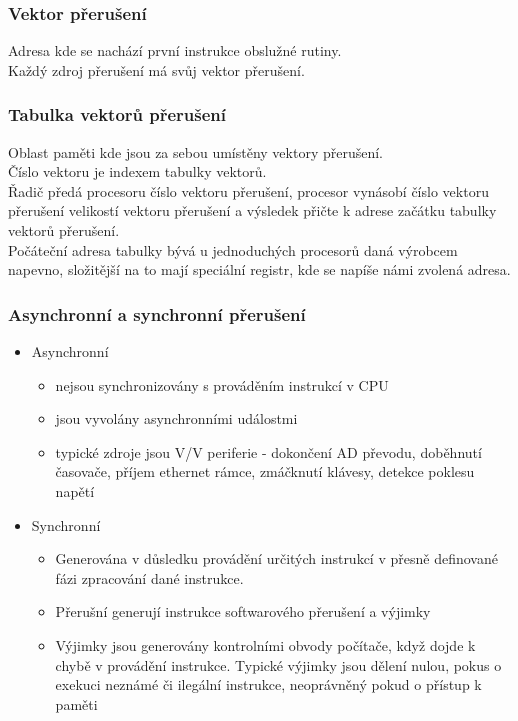 \subsubsection*{Vektor přerušení}
Adresa kde se nachází první instrukce obslužné rutiny.\\
Každý zdroj přerušení má svůj vektor přerušení.\\

\subsubsection*{Tabulka vektorů přerušení}
Oblast paměti kde jsou za sebou umístěny vektory přerušení.\\
Číslo vektoru je indexem tabulky vektorů.\\
Řadič předá procesoru číslo vektoru přerušení, procesor vynásobí číslo vektoru přerušení velikostí vektoru přerušení a výsledek přičte k adrese začátku tabulky vektorů přerušení.\\
Počáteční adresa tabulky bývá u jednoduchých procesorů daná výrobcem napevno, složitější na to mají speciální registr, kde se napíše námi zvolená adresa.

\subsubsection*{Asynchronní a synchronní přerušení}
\begin{itemize}
    \item Asynchronní
          \begin{itemize}
              \item nejsou synchronizovány s prováděním instrukcí v CPU
              \item jsou vyvolány asynchronními událostmi
              \item typické zdroje jsou V/V periferie - dokončení AD převodu, doběhnutí časovače, příjem ethernet rámce, zmáčknutí klávesy, detekce poklesu napětí
          \end{itemize}
    \item Synchronní
          \begin{itemize}
              \item Generována v důsledku provádění určitých instrukcí v přesně definované fázi zpracování dané instrukce.
              \item Přerušní generují instrukce softwarového přerušení a výjimky
              \item Výjimky jsou generovány kontrolními obvody počítače, když dojde k chybě v provádění instrukce. Typické výjimky jsou dělení nulou, pokus o exekuci neznámé či ilegální instrukce, neoprávněný pokud o přístup k paměti
          \end{itemize}
\end{itemize}

